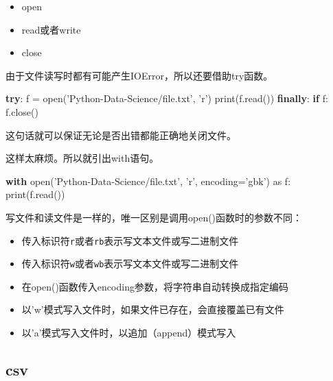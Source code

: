 \documentclass[12pt]{ctexart}
\providecommand{\tightlist}{%
      \setlength{\itemsep}{0pt}\setlength{\parskip}{0pt}}
\newenvironment{Shaded}{}{}
\newcommand{\StringTok}[1]{\textcolor[rgb]{0.25,0.44,0.63}{{#1}}}
\newcommand{\NormalTok}[1]{{#1}}
\newcommand{\ImportTok}[1]{{#1}}
\newcommand{\ControlFlowTok}[1]{\textcolor[rgb]{0.00,0.44,0.13}{\textbf{{#1}}}}
\newcommand{\OperatorTok}[1]{\textcolor[rgb]{0.40,0.40,0.40}{{#1}}}
\newcommand{\BuiltInTok}[1]{{#1}}
\begin{document}
\begin{itemize}
\tightlist
\item
  open
\item
  read或者write
\item
  close
\end{itemize}

由于文件读写时都有可能产生IOError，所以还要借助try函数。

\begin{Shaded}
\begin{Highlighting}[]
\ControlFlowTok{try}\NormalTok{:}
\NormalTok{    f }\OperatorTok{=} \BuiltInTok{open}\NormalTok{(}\StringTok{'Python-Data-Science/file.txt'}\NormalTok{, }\StringTok{'r'}\NormalTok{)}
    \BuiltInTok{print}\NormalTok{(f.read())}
\ControlFlowTok{finally}\NormalTok{:}
    \ControlFlowTok{if}\NormalTok{ f:}
\NormalTok{        f.close()}
\end{Highlighting}
\end{Shaded}

这句话就可以保证无论是否出错都能正确地关闭文件。

这样太麻烦。所以就引出with语句。

\begin{Shaded}
\begin{Highlighting}[]
\ControlFlowTok{with} \BuiltInTok{open}\NormalTok{(}\StringTok{'Python-Data-Science/file.txt'}\NormalTok{, }\StringTok{'r'}\NormalTok{, encoding}\OperatorTok{=}\StringTok{'gbk'}\NormalTok{) }\ImportTok{as}\NormalTok{ f:}
    \BuiltInTok{print}\NormalTok{(f.read())}
\end{Highlighting}
\end{Shaded}

写文件和读文件是一样的，唯一区别是调用open()函数时的参数不同：

\begin{itemize}
\item
  传入标识符\texttt{r}或者\texttt{rb}表示写文本文件或写二进制文件
\item
  传入标识符\texttt{w}或者\texttt{wb}表示写文本文件或写二进制文件
\item
  在open()函数传入encoding参数，将字符串自动转换成指定编码
\item
  以'w'模式写入文件时，如果文件已存在，会直接覆盖已有文件
\item
  以'a'模式写入文件时，以追加（append）模式写入
\end{itemize}

    \hypertarget{csv}{%
\subsection{csv}\label{csv}}
\end{document}

